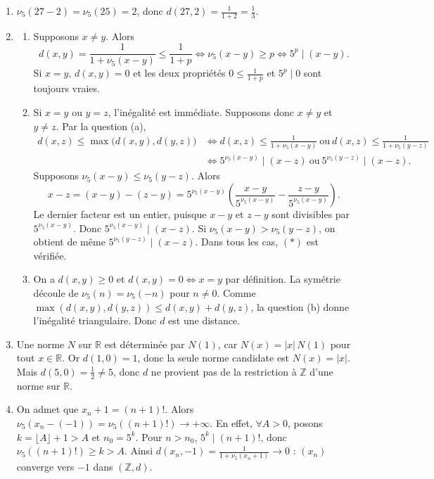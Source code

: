 \documentclass[11pt,a4paper]{article}
\newcommand{\R}{\mathbb{R}}
\begin{document}
\begin{enumerate}[label=\arabic*.,leftmargin=*,itemsep=1em]
\item $\nu_5(27-2)=\nu_5(25)=2$, donc $d(27,2)=\frac{1}{1+2}=\frac13$.

\item
  \begin{enumerate}[label=(\alph*),itemsep=.6em]
  \item Supposons $x\neq y$. Alors
  \[
    d(x,y)=\frac{1}{1+\nu_5(x-y)}\leq\frac{1}{1+p}
    \iff\nu_5(x-y)\geq p\iff 5^p\mid(x-y).
  \]
  Si $x=y$, $d(x,y)=0$ et les deux propriétés $0\leq\frac{1}{1+p}$ et $5^p\mid0$ sont toujours vraies.

  \item Si $x=y$ ou $y=z$, l'inégalité est immédiate. Supposons donc $x\neq y$ et $y\neq z$. Par la question (a),
  \begin{align*}
    d(x,z)\leq\max\bigl(d(x,y),d(y,z)\bigr)
    &\iff d(x,z)\leq\frac{1}{1+\nu_5(x-y)}\ \text{ou}\ d(x,z)\leq\frac{1}{1+\nu_5(y-z)}\\
    &\iff 5^{\nu_5(x-y)}\mid(x-z)\ \text{ou}\ 5^{\nu_5(y-z)}\mid(x-z).\tag{$*$}
  \end{align*}
  Supposons $\nu_5(x-y)\leq\nu_5(y-z)$. Alors
  \[
    x-z=(x-y)-(z-y)
    =5^{\nu_5(x-y)}\left(\frac{x-y}{5^{\nu_5(x-y)}}-\frac{z-y}{5^{\nu_5(x-y)}}\right).
  \]
  Le dernier facteur est un entier, puisque $x-y$ et $z-y$ sont divisibles par $5^{\nu_5(x-y)}$. Donc $5^{\nu_5(x-y)}\mid(x-z)$. Si $\nu_5(x-y)>\nu_5(y-z)$, on obtient de même $5^{\nu_5(y-z)}\mid(x-z)$. Dans tous les cas, $(*)$ est vérifiée.

  \item On a $d(x,y)\geq0$ et $d(x,y)=0\iff x=y$ par définition. La symétrie découle de $\nu_5(n)=\nu_5(-n)$ pour $n\neq0$. Comme $\max(d(x,y),d(y,z))\leq d(x,y)+d(y,z)$, la question (b) donne l'inégalité triangulaire. Donc $d$ est une distance.
  \end{enumerate}

\item Une norme $N$ sur $\R$ est déterminée par $N(1)$, car $N(x)=|x|\,N(1)$ pour tout $x\in\R$. Or $d(1,0)=1$, donc la seule norme candidate est $N(x)=|x|$. Mais $d(5,0)=\frac12\neq5$, donc $d$ ne provient pas de la restriction à $\mathbb Z$ d'une norme sur $\R$.

\item On admet que $x_n+1=(n+1)!$. Alors $\nu_5(x_n-(-1))=\nu_5((n+1)!)\to+\infty$. En effet, $\forall A>0$, posons $k=\lfloor A\rfloor+1>A$ et $n_0=5^k$. Pour $n>n_0$, $5^k\mid(n+1)!$, donc $\nu_5((n+1)!)\geq k>A$. Ainsi $d(x_n,-1)=\frac{1}{1+\nu_5(x_n+1)}\to0$ : $(x_n)$ converge vers $-1$ dans $(\mathbb Z,d)$.
\end{enumerate}
\end{document}
